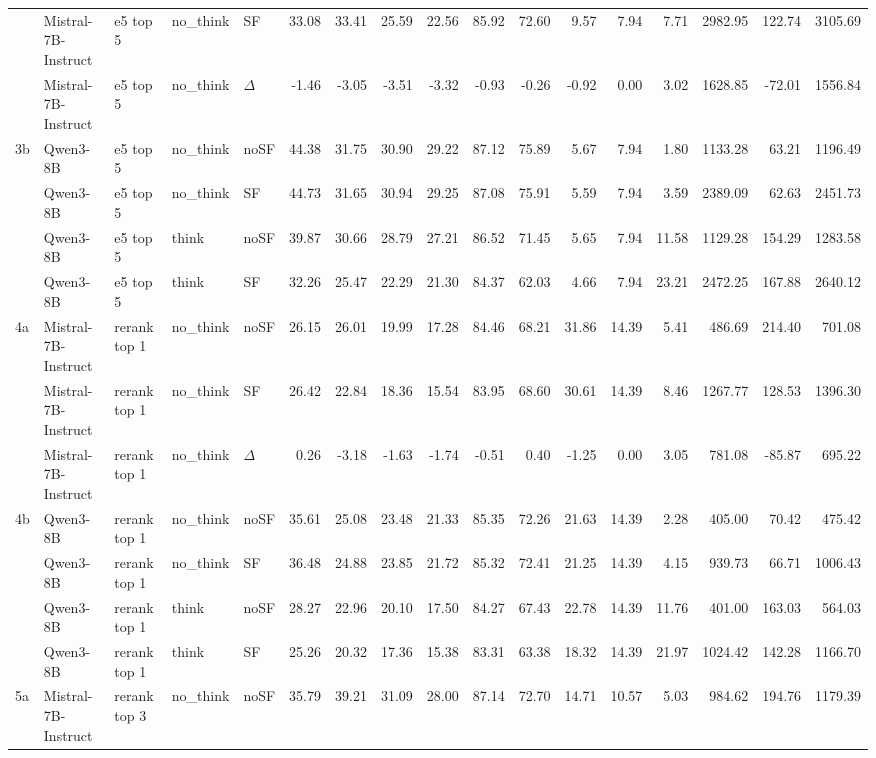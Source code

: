 \begin{landscape}
\begin{footnotesize}
\begin{longtable}{l l l l l r r r r r r r r r r r r}
 & Mistral-7B-Instruct & e5 top 5 & no\_think & SF & 33.08 & 33.41 & 25.59 & 22.56 & 85.92 & 72.60 & 9.57 & 7.94 & 7.71 & 2982.95 & 122.74 & 3105.69 \\
 & Mistral-7B-Instruct & e5 top 5 & no\_think & $\Delta$ & -1.46 & -3.05 & -3.51 & -3.32 & -0.93 & -0.26 & -0.92 & 0.00 & 3.02 & 1628.85 & -72.01 & 1556.84 \\
3b & Qwen3-8B & e5 top 5 & no\_think & noSF & 44.38 & 31.75 & 30.90 & 29.22 & 87.12 & 75.89 & 5.67 & 7.94 & 1.80 & 1133.28 & 63.21 & 1196.49 \\
 & Qwen3-8B & e5 top 5 & no\_think & SF & 44.73 & 31.65 & 30.94 & 29.25 & 87.08 & 75.91 & 5.59 & 7.94 & 3.59 & 2389.09 & 62.63 & 2451.73 \\
 & Qwen3-8B & e5 top 5 & think & noSF & 39.87 & 30.66 & 28.79 & 27.21 & 86.52 & 71.45 & 5.65 & 7.94 & 11.58 & 1129.28 & 154.29 & 1283.58 \\
 & Qwen3-8B & e5 top 5 & think & SF & 32.26 & 25.47 & 22.29 & 21.30 & 84.37 & 62.03 & 4.66 & 7.94 & 23.21 & 2472.25 & 167.88 & 2640.12 \\
\midrule
4a & Mistral-7B-Instruct & rerank top 1 & no\_think & noSF & 26.15 & 26.01 & 19.99 & 17.28 & 84.46 & 68.21 & 31.86 & 14.39 & 5.41 & 486.69 & 214.40 & 701.08 \\
 & Mistral-7B-Instruct & rerank top 1 & no\_think & SF & 26.42 & 22.84 & 18.36 & 15.54 & 83.95 & 68.60 & 30.61 & 14.39 & 8.46 & 1267.77 & 128.53 & 1396.30 \\
 & Mistral-7B-Instruct & rerank top 1 & no\_think & $\Delta$ & 0.26 & -3.18 & -1.63 & -1.74 & -0.51 & 0.40 & -1.25 & 0.00 & 3.05 & 781.08 & -85.87 & 695.22 \\
4b & Qwen3-8B & rerank top 1 & no\_think & noSF & 35.61 & 25.08 & 23.48 & 21.33 & 85.35 & 72.26 & 21.63 & 14.39 & 2.28 & 405.00 & 70.42 & 475.42 \\
 & Qwen3-8B & rerank top 1 & no\_think & SF & 36.48 & 24.88 & 23.85 & 21.72 & 85.32 & 72.41 & 21.25 & 14.39 & 4.15 & 939.73 & 66.71 & 1006.43 \\
 & Qwen3-8B & rerank top 1 & think & noSF & 28.27 & 22.96 & 20.10 & 17.50 & 84.27 & 67.43 & 22.78 & 14.39 & 11.76 & 401.00 & 163.03 & 564.03 \\
 & Qwen3-8B & rerank top 1 & think & SF & 25.26 & 20.32 & 17.36 & 15.38 & 83.31 & 63.38 & 18.32 & 14.39 & 21.97 & 1024.42 & 142.28 & 1166.70 \\
\midrule
5a & Mistral-7B-Instruct & rerank top 3 & no\_think & noSF & 35.79 & 39.21 & 31.09 & 28.00 & 87.14 & 72.70 & 14.71 & 10.57 & 5.03 & 984.62 & 194.76 & 1179.39 \\

\end{longtable}
\end{footnotesize}
\end{landscape}

